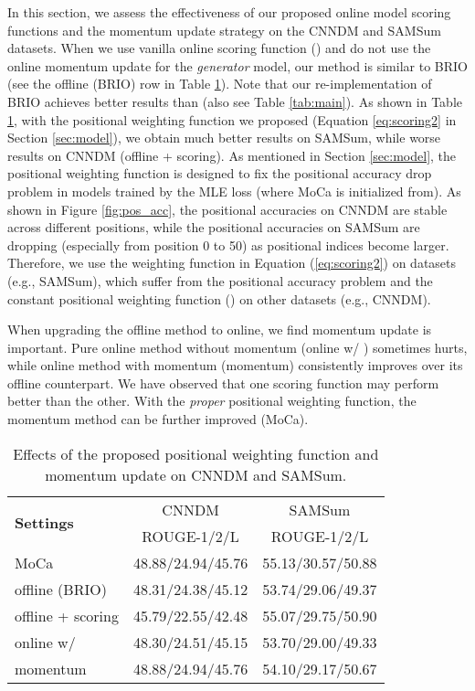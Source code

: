 \documentclass{article}
\begin{document}
In this section, we assess the effectiveness of our proposed online model scoring functions and the momentum update strategy on the CNNDM and SAMSum datasets. When we use vanilla online scoring function () and do not use the online momentum update for the \emph{generator} model, our method is similar to BRIO \cite{liu-etal-2022-brio} (see the offline (BRIO) row in Table \ref{tab:ablation}). Note that our re-implementation of BRIO achieves better results than \cite{liu-etal-2022-brio} (also see Table \ref{tab:main}). As shown in Table \ref{tab:ablation}, with the positional weighting function we proposed (Equation  \ref{eq:scoring2} in Section \ref{sec:model}), we obtain much better results on SAMSum, while worse results on CNNDM (offline + scoring). As mentioned in Section \ref{sec:model}, the positional weighting function is designed to fix the positional accuracy drop problem in models trained by the MLE loss (where MoCa is initialized from). As shown in Figure \ref{fig:pos_acc}, the positional accuracies on CNNDM are stable across different positions, while the positional accuracies on SAMSum are dropping (especially from position 0 to 50) as positional indices become larger.
Therefore, we use the weighting function in Equation (\ref{eq:scoring2}) on datasets (e.g., SAMSum), which suffer from the positional accuracy problem and the constant positional weighting function () on other datasets (e.g., CNNDM).

When upgrading the offline method to online, we find momentum update is important. Pure online method without momentum (online w/ ) sometimes hurts, while online method with momentum (momentum) consistently improves over its offline counterpart. We have observed that one scoring function may perform better than the other. With the \emph{proper} positional weighting function, the momentum method can be further improved (MoCa).

\begin{table}[t]
\small
\begin{center}
\begin{tabular}{l|c|c}
\hline
\multirow{2}{*}{\bf Settings}  & CNNDM & SAMSum  \\
 & ROUGE-1/2/L & ROUGE-1/2/L \\

\hline
MoCa & 48.88/24.94/45.76 & 55.13/30.57/50.88 \\
\hline
offline (BRIO) & 48.31/24.38/45.12 & 53.74/29.06/49.37 \\
offline + scoring & 45.79/22.55/42.48 & 55.07/29.75/50.90 \\
online w/  & 48.30/24.51/45.15 & 53.70/29.00/49.33 \\
momentum & 48.88/24.94/45.76 & 54.10/29.17/50.67 \\

\hline

\end{tabular}
\end{center}
\caption{Effects of the proposed positional weighting function and momentum update on CNNDM and SAMSum.}
\label{tab:ablation}
\end{table}
\end{document}
